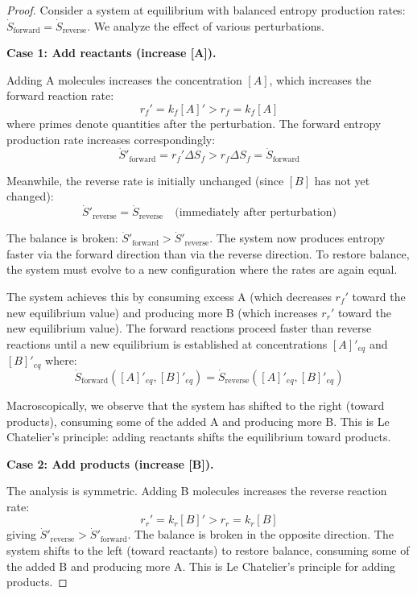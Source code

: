 \documentclass[12pt,a4paper]{article}
\theoremstyle{definition}
\theoremstyle{remark}
\begin{document}
\begin{proof}
Consider a system at equilibrium with balanced entropy production rates: $\dot{S}_{\text{forward}} = \dot{S}_{\text{reverse}}$. We analyze the effect of various perturbations.

\textbf{Case 1: Add reactants (increase [A]).}

Adding A molecules increases the concentration $[A]$, which increases the forward reaction rate:
\begin{equation}
r_f' = k_f [A]' > r_f = k_f [A]
\end{equation}
where primes denote quantities after the perturbation. The forward entropy production rate increases correspondingly:
\begin{equation}
\dot{S}'_{\text{forward}} = r_f' \Delta S_f > r_f \Delta S_f = \dot{S}_{\text{forward}}
\end{equation}

Meanwhile, the reverse rate is initially unchanged (since $[B]$ has not yet changed):
\begin{equation}
\dot{S}'_{\text{reverse}} = \dot{S}_{\text{reverse}} \quad \text{(immediately after perturbation)}
\end{equation}

The balance is broken: $\dot{S}'_{\text{forward}} > \dot{S}'_{\text{reverse}}$. The system now produces entropy faster via the forward direction than via the reverse direction. To restore balance, the system must evolve to a new configuration where the rates are again equal.

The system achieves this by consuming excess A (which decreases $r_f'$ toward the new equilibrium value) and producing more B (which increases $r_r'$ toward the new equilibrium value). The forward reactions proceed faster than reverse reactions until a new equilibrium is established at concentrations $[A]'_{eq}$ and $[B]'_{eq}$ where:
\begin{equation}
\dot{S}_{\text{forward}}([A]'_{eq}, [B]'_{eq}) = \dot{S}_{\text{reverse}}([A]'_{eq}, [B]'_{eq})
\end{equation}

Macroscopically, we observe that the system has shifted to the right (toward products), consuming some of the added A and producing more B. This is Le Chatelier's principle: adding reactants shifts the equilibrium toward products.

\textbf{Case 2: Add products (increase [B]).}

The analysis is symmetric. Adding B molecules increases the reverse reaction rate:
\begin{equation}
r_r' = k_r [B]' > r_r = k_r [B]
\end{equation}
giving $\dot{S}'_{\text{reverse}} > \dot{S}'_{\text{forward}}$. The balance is broken in the opposite direction. The system shifts to the left (toward reactants) to restore balance, consuming some of the added B and producing more A. This is Le Chatelier's principle for adding products.


\end{proof}
\end{document}
